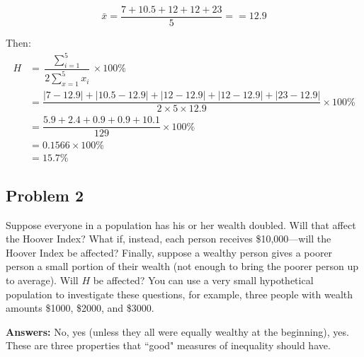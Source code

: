 \documentclass[12pt]{memoir}\usepackage[]{graphicx}\usepackage[table]{xcolor}
\begin{document}
$$\bar{x} = \dfrac{7 + 10.5 + 12 + 12 + 23}{5} = = 12.9$$

Then:
\begin{align*} 
H &= \dfrac{\sum_{i = 1}^5}{2\sum_{x = 1}^5 x_i} \times 100\% \\[10pt]
&= \dfrac{ |7 - 12.9| + |10.5 - 12.9| + |12 - 12.9| + |12 - 12.9| + |23 - 12.9|}{2\times 5\times 12.9} \times 100\% \\[10pt]
&= \dfrac{5.9 + 2.4 + 0.9 + 0.9 + 10.1}{129} \times 100\% \\[10pt]
&= 0.1566 \times 100\% \\[10pt]
&= 15.7\%
\end{align*}

\subsection*{Problem 2}
Suppose everyone in a population has his or her wealth doubled.  Will
that affect the Hoover Index?  What if, instead, each person receives 
\$10{,}000---will the Hoover Index be affected?  Finally, suppose a wealthy person
gives a poorer person a small portion of their wealth (not enough to bring the poorer 
person up to average).  Will $H$ be affected?  You can use a very small
hypothetical population to investigate these questions, for example, three people
with wealth amounts \$1000, \$2000, and \$3000.

\textbf{Answers:}  No, yes (unless they all were equally wealthy at the beginning), yes.
These are three properties that ``good" measures of inequality should have.

\theendnotes
\end{document}

